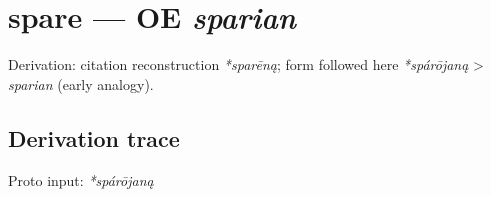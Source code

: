 \documentclass[
  british,
  a4paper,
  openany]{book}
\providecommand{\texorpdfstring}[2]{#1}
\begin{document}
\section{\texorpdfstring{spare --- OE
\emph{sparian}}{spare --- OE sparian}}\label{spare-oe-sparian}


Derivation: citation reconstruction \emph{*sparēną}; form followed here
\emph{*spárōjaną} \textgreater{} \emph{sparian} (early analogy).

\subsection{Derivation trace}\label{derivation-trace-96}

Proto input: \emph{*spárōjaną}

\begingroup
\setlength{\fboxsep}{6pt}
\end{document}
